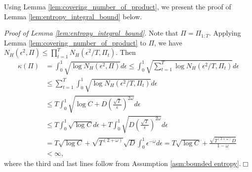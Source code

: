 \medskip

Using Lemma \ref{lem:covering_number_of_product}, we present the proof of Lemma \ref{lem:entropy_integral_bound} below.

\bigskip
\noindent
\textit{Proof of Lemma \ref{lem:entropy_integral_bound}}.
Note that $\Pi=\Pi_{1:T}$. Applying Lemma \ref{lem:covering_number_of_product} to $\Pi$, we have $N_{H}(\epsilon^2,\Pi) \leq \prod_{t=1}^{T} N_{H}(\epsilon^2/T,\Pi_{t})$. Then
\begin{align*}
\kappa(\Pi)&=\int_{0}^{1}\sqrt{\log N_{H}\left(\epsilon^{2},\Pi\right)}d\epsilon 
\leq\int_{0}^{1}\sqrt{\sum_{t=1}^{T}\log N_{H}(\epsilon^{2}/T,\Pi_{t})}d\epsilon\\
&\leq \sum_{t=1}^{T} \int_{0}^{1}\sqrt{\log N_{H}(\epsilon^{2}/T,\Pi_{t})}d\epsilon\\
&\leq T \int_{0}^{1}\sqrt{\log C+D\left(\frac{\sqrt{T}}{\epsilon}\right)^{2\omega}}d\epsilon \\
&\leq T \int_{0}^{1}\sqrt{\log C}d\epsilon+ T\int_{0}^{1}\sqrt{D\left(\frac{\sqrt{T}}{\epsilon}\right)^{2\omega}}d\epsilon\\
&=T\sqrt{\log C}+\sqrt{T^{(2+\omega)}}\sqrt{D}\int_{0}^{1}\epsilon^{-\omega}d\epsilon=T\sqrt{\log C}+\frac{\sqrt{T^{(2+\omega)}D}}{1-\omega} \\
&<\infty,    
\end{align*}
where the third and last lines follow from Assumption \ref{asm:bounded entropy}.\hfill {\large $\Box$}

\bigskip


